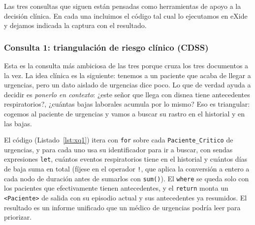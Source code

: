 \documentclass[../main.tex]{subfiles}
\begin{document}
Las tres consultas que siguen están pensadas como herramientas de apoyo a la decisión clínica. En cada una incluimos el código tal cual lo ejecutamos en eXide y dejamos indicada la captura con el resultado.

\subsubsection{Consulta 1: triangulación de riesgo clínico (CDSS)}

Esta es la consulta más ambiciosa de las tres porque cruza los tres documentos a la vez. La idea clínica es la siguiente: tenemos a un paciente que acaba de llegar a urgencias, pero un dato aislado de urgencias dice poco. Lo que de verdad ayuda a decidir es \textit{ponerlo en contexto}: ¿este señor que llega con disnea tiene antecedentes respiratorios?, ¿cuántas bajas laborales acumula por lo mismo? Eso es triangular: cogemos al paciente de urgencias y vamos a buscar su rastro en el historial y en las bajas.

El código (Listado~\ref{lst:xq1}) itera con \texttt{for} sobre cada \texttt{Paciente\_Critico} de urgencias, y para cada uno usa su identificador para ir a buscar, con sendas expresiones \texttt{let}, cuántos eventos respiratorios tiene en el historial y cuántos días de baja suma en total (fíjese en el operador \texttt{!}, que aplica la conversión a entero a cada nodo de duración antes de sumarlos con \texttt{sum()}). El \texttt{where} se queda solo con los pacientes que efectivamente tienen antecedentes, y el \texttt{return} monta un \texttt{<Paciente>} de salida con su episodio actual y sus antecedentes ya resumidos. El resultado es un informe unificado que un médico de urgencias podría leer para priorizar.
\end{document}
